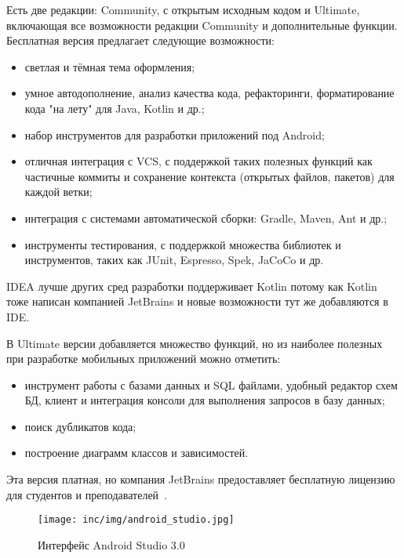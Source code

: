 Есть две редакции: Community, с открытым исходным кодом и Ultimate, включающая все возможности редакции Community и дополнительные функции.
Бесплатная версия предлагает следующие возможности:
\begin{itemize}
  \item светлая и тёмная тема оформления;
  \item умное автодополнение, анализ качества кода, рефакторинги, форматирование кода "на лету" для Java, Kotlin и др.;
  \item набор инструментов для разработки приложений под Android;
  \item отличная интеграция с VCS, с поддержкой таких полезных функций как частичные коммиты и сохранение контекста (открытых файлов, пакетов) для каждой ветки;
  \item интеграция с системами автоматической сборки: Gradle, Maven, Ant и др.;
  \item инструменты тестирования, с поддержкой множества библиотек и инструментов, таких как JUnit, Espresso, Spek, JaCoCo и др.
\end{itemize}

IDEA лучше других сред разработки поддерживает Kotlin потому как Kotlin тоже написан компанией JetBrains и новые возможности тут же добавляются в IDE\@.

В Ultimate версии добавляется множество функций, но из наиболее полезных при разработке мобильных приложений можно отметить:
\begin{itemize}
  \item инструмент работы с базами данных и SQL файлами, удобный редактор схем БД, клиент и интеграция консоли для выполнения запросов в базу данных;
  \item поиск дубликатов кода;
  \item построение диаграмм классов и зависимостей.
\end{itemize}

Эта версия платная, но компания JetBrains предоставляет бесплатную лицензию для студентов и преподавателей~\cite{jetbrains:idea}.

\begin{figure}[ht]
  \centering
  \texttt{[image: inc/img/android\_studio.jpg]}
  \caption{Интерфейс Android Studio 3.0}
  \label{fig:as}
\end{figure}

